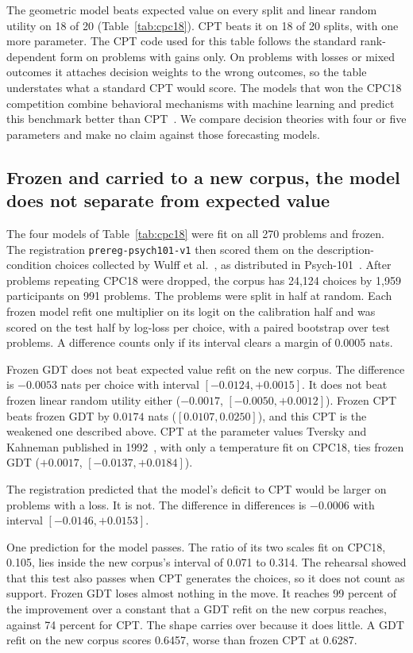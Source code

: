 \documentclass[journal]{IEEEtran}
\begin{document}
The geometric model beats expected value on every split and linear random utility on 18 of 20 (Table~\ref{tab:cpc18}).
CPT beats it on 18 of 20 splits, with one more parameter.
The CPT code used for this table follows the standard rank-dependent form on problems with gains only.
On problems with losses or mixed outcomes it attaches decision weights to the wrong outcomes, so the table understates what a standard CPT would score.
The models that won the CPC18 competition combine behavioral mechanisms with machine learning and predict this benchmark better than CPT~\cite{plonsky2019}.
We compare decision theories with four or five parameters and make no claim against those forecasting models.

\subsection{Frozen and carried to a new corpus, the model does not separate from expected value}
The four models of Table~\ref{tab:cpc18} were fit on all 270 problems and frozen.
The registration \texttt{prereg-psych101-v1} then scored them on the description-condition choices collected by Wulff et al.~\cite{wulff2018}, as distributed in Psych-101~\cite{binz2025}.
After problems repeating CPC18 were dropped, the corpus has 24{,}124 choices by 1{,}959 participants on 991 problems.
The problems were split in half at random.
Each frozen model refit one multiplier on its logit on the calibration half and was scored on the test half by log-loss per choice, with a paired bootstrap over test problems.
A difference counts only if its interval clears a margin of 0.0005 nats.

Frozen GDT does not beat expected value refit on the new corpus.
The difference is $-0.0053$ nats per choice with interval $[-0.0124,+0.0015]$.
It does not beat frozen linear random utility either ($-0.0017$, $[-0.0050,+0.0012]$).
Frozen CPT beats frozen GDT by $0.0174$ nats ($[0.0107,0.0250]$), and this CPT is the weakened one described above.
CPT at the parameter values Tversky and Kahneman published in 1992~\cite{tversky1992}, with only a temperature fit on CPC18, ties frozen GDT ($+0.0017$, $[-0.0137,+0.0184]$).

The registration predicted that the model's deficit to CPT would be larger on problems with a loss.
It is not.
The difference in differences is $-0.0006$ with interval $[-0.0146,+0.0153]$.

One prediction for the model passes.
The ratio of its two scales fit on CPC18, 0.105, lies inside the new corpus's interval of 0.071 to 0.314.
The rehearsal showed that this test also passes when CPT generates the choices, so it does not count as support.
Frozen GDT loses almost nothing in the move.
It reaches 99 percent of the improvement over a constant that a GDT refit on the new corpus reaches, against 74 percent for CPT.
The shape carries over because it does little.
A GDT refit on the new corpus scores 0.6457, worse than frozen CPT at 0.6287.
\end{document}

